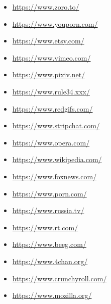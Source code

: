 \begin{multicols}{2}
\begin{itemize}
    \item \url{https://www.zoro.to/}
    \item \url{https://www.youporn.com/}
    \item \url{https://www.etsy.com/}
    \item \url{https://www.vimeo.com/}
    \item \url{https://www.pixiv.net/}
    \item \url{https://www.rule34.xxx/}
    \item \url{https://www.redgifs.com/}
    \item \url{https://www.stripchat.com/}
    \item \url{https://www.opera.com/}
    \item \url{https://www.wikipedia.com/}
    \item \url{https://www.foxnews.com/}
    \item \url{https://www.porn.com/}
    \item \url{https://www.russia.tv/}
    \item \url{https://www.rt.com/}
    \item \url{https://www.beeg.com/}
    \item \url{https://www.4chan.org/}
    \item \url{https://www.crunchyroll.com/}
    \item \url{https://www.mozilla.org/}
\end{itemize}
\end{multicols}


